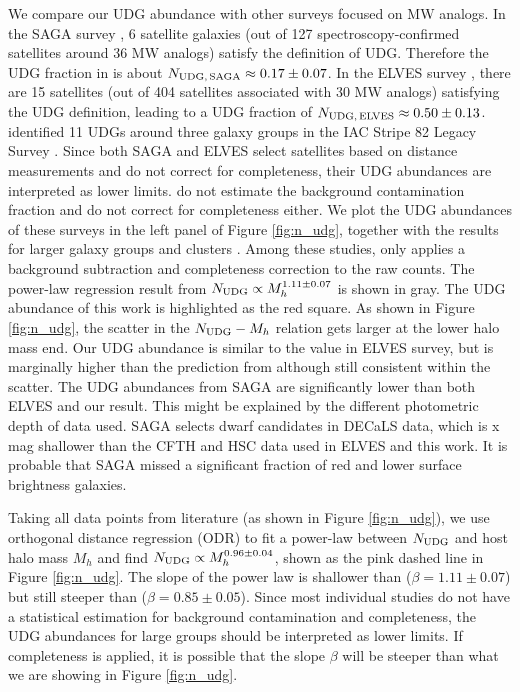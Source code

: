 \documentclass[twocolumn,astrosymb,twocolappendix]{aastex631}
\begin{document}
\begin{CJK*}{UTF8}{gbsn}
We compare our UDG abundance with other surveys focused on MW analogs. In the SAGA survey \citep{SAGA-II}, 6 satellite galaxies (out of 127 spectroscopy-confirmed satellites around 36 MW analogs) satisfy the definition of UDG. Therefore the UDG fraction in \citet{SAGA-II} is about $N_{\rm UDG,\, SAGA} \approx 0.17\pm0.07$. In the ELVES survey \citep{CarlstenELVES2022}, there are 15 satellites (out of 404 satellites associated with 30 MW analogs) satisfying the UDG definition, leading to a UDG fraction of $N_{\rm UDG,\, ELVES} \approx 0.50\pm0.13$. \citet{Roman2017b} identified 11 UDGs around three galaxy groups in the IAC Stripe 82 Legacy Survey \citep{Fliri2016}. Since both SAGA and ELVES select satellites based on distance measurements and do not correct for completeness, their UDG abundances are interpreted as lower limits. \citet{Roman2017b} do not estimate the background contamination fraction and do not correct for completeness either. We plot the UDG abundances of these surveys in the left panel of Figure \ref{fig:n_udg}, together with the results for larger galaxy groups and clusters \citep{Koda2015,Munoz2015,Roman2017a,Roman2017b,Janssens2017,vdBurg2017}. Among these studies, only \citet{vdBurg2017} applies a background subtraction and completeness correction to the raw counts. The power-law regression result from \citet{vdBurg2017} $N_{\rm UDG} \propto M_h^{1.11\pm 0.07}$ is shown in gray. The UDG abundance of this work is highlighted as the red square. As shown in Figure \ref{fig:n_udg}, the scatter in the $N_{\rm UDG}-M_h$ relation gets larger at the lower halo mass end. Our UDG abundance is similar to the value in ELVES survey, but is marginally higher than the prediction from \citet{vdBurg2017} although still consistent within the scatter. The UDG abundances from SAGA are significantly lower than both ELVES and our result. This might be explained by the different photometric depth of data used. SAGA selects dwarf candidates in DECaLS data, which is x mag shallower than the CFTH and HSC data used in ELVES and this work. It is probable that SAGA missed a significant fraction of red and lower surface brightness galaxies. 

Taking all data points from literature (as shown in Figure \ref{fig:n_udg}), we use orthogonal distance regression (ODR) to fit a power-law between $N_{\rm UDG}$ and host halo mass $M_h$ and find $N_{\rm UDG} \propto M_h^{0.96\pm 0.04}$, shown as the pink dashed line in Figure \ref{fig:n_udg}. The slope of the power law is shallower than \citet{vdBurg2017} ($\beta=1.11\pm0.07$) but still steeper than \citet{Roman2017b} ($\beta=0.85\pm0.05$). Since most individual studies do not have a statistical estimation for background contamination and completeness, the UDG abundances for large groups should be interpreted as lower limits. If completeness is applied, it is possible that the slope $\beta$ will be steeper than what we are showing in Figure \ref{fig:n_udg}.


\end{CJK*}
\end{document}
